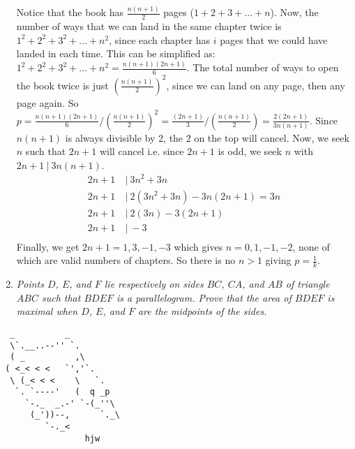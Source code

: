 \documentclass{article}
\begin{document}
\begin{enumerate}[1.]
Notice that the book has $\frac{n(n+1)}{2}$ pages ($1+2+3+...+n$). Now, the number of ways that we can land in the same chapter twice is $1^2+2^2+3^2+...+n^2$, since each chapter has $i$ pages that we could have landed in each time. This can be simplified as: $1^2+2^2+3^2+...+n^2 = \frac{n(n+1)(2n+1)}{6}$. The total number of ways to open the book twice is just $(\frac{n(n+1)}{2})^2$, since we can land on any page, then any page again. So $p = \frac{n(n+1)(2n+1)}{6}/(\frac{n(n+1)}{2})^2 = \frac{(2n+1)}{3}/(\frac{n(n+1)}{2})=\frac{2(2n+1)}{3n(n+1)}$. Since $n(n+1)$ is always divisible by 2, the 2 on the top will cancel. Now, we seek $n$ such that $2n+1$ will cancel i.e. since $2n+1$ is odd, we seek $n$ with $2n+1\:|\: 3n(n+1)$.
\begin{align*}
2n+1\:&|\: 3n^2+3n\\
2n+1\:&|\: 2(3n^2+3n)-3n(2n+1) = 3n\\
2n+1\:&|\: 2(3n)-3(2n+1)\\
2n+1\:&|\: -3\\
\end{align*}
Finally, we get $2n+1=1,3,-1,-3$ which gives $n=0,1,-1,-2$, none of which are valid numbers of chapters. So there is no $n>1$ giving $p=\frac{1}{k}$.


\item %
{\itshape Points $D$, $E$, and $F$ lie respectively on sides $BC$, $CA$, and $AB$ of triangle $ABC$ such that $BDEF$ is a parallelogram. Prove that the area of $BDEF$ is maximal when $D$, $E$, and $F$ are the midpoints of the sides.}


\end{enumerate}

\vfill
\centering
\begin{BVerbatim}
  _          _
  \`.__..--'' `.
  ( _          ,\
 ( <_< < <   `','`.
  \ (_< < <    \   `.
   `. `----'   (  q _p
     `-._  _.-' `-(_''\
      (_'))--,      `._\
         `-._<
                 hjw
\end{BVerbatim}
\end{document}
